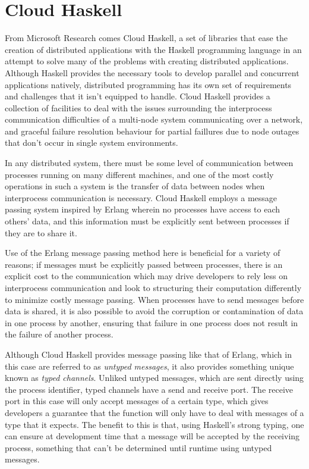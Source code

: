 \documentclass[10pt,a4paper,twocolumn]{article}
\begin{document}
\section{Cloud Haskell}

From Microsoft Research comes Cloud Haskell, a set of libraries that ease the
creation of distributed applications with the Haskell programming language in an
attempt to solve many of the problems with creating distributed applications.
Although Haskell provides the necessary tools to develop parallel and concurrent
applications natively, distributed programming has its own set of requirements
and challenges that it isn't equipped to handle. Cloud Haskell provides a
collection of facilities to deal with the issues surrounding the interprocess
communication difficulties of a multi-node system communicating over a network,
and graceful failure resolution behaviour for partial faillures due to node
outages that don't occur in single system environments.

In any distributed system, there must be some level of communication between
processes running on many different machines, and one of the most costly
operations in such a system is the transfer of data between nodes when
interprocess communication is necessary. Cloud Haskell employs a message passing
system inspired by Erlang wherein no processes have access to each others' data,
and this information must be explicitly sent between processes if they are to
share it.

Use of the Erlang message passing method here is beneficial for a variety of
reasons; if messages must be explicitly passed between processes, there is an
explicit cost to the communication which may drive developers to rely less on
interprocess communication and look to structuring their computation differently
to minimize costly message passing. When processes have to send messages before
data is shared, it is also possible to avoid the corruption or contamination of
data in one process by another, ensuring that failure in one process does not
result in the failure of another process.

Although Cloud Haskell provides message passing like that of Erlang, which in
this case are referred to as \emph{untyped messages}, it also provides something
unique known as \emph{typed channels}. Unliked untyped messages, which are sent
directly using the process identifier, typed channels have a send and receive
port. The receive port in this case will only accept messages of a certain type,
which gives developers a guarantee that the function will only have to deal with
messages of a type that it expects. The benefit to this is that, using Haskell's
strong typing, one can ensure at development time that a message will be
accepted by the receiving process, something that can't be determined until
runtime using untyped messages.
\end{document}
